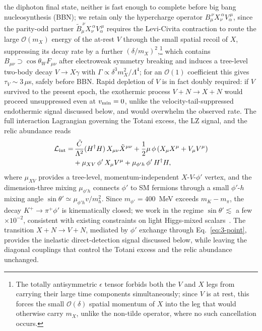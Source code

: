 \documentclass[aps,prl,twocolumn,superscriptaddress,nofootinbib]{revtex4-2}
\begin{document}
the diphoton final state, neither is fast enough to complete before big
bang nucleosynthesis (BBN); we retain only the hypercharge operator
$B_\mu^{\ \nu}X_\nu^{\ \alpha}V_\alpha^{\ \mu}$, since the parity-odd
partner $\tilde B_\mu^{\ \nu}X_\nu^{\ \alpha}V_\alpha^{\ \mu}$ requires
the Levi-Civita contraction to route the large $\mathcal{O}(m_X)$
energy of the at-rest $V$ through the small spatial recoil of $X$,
suppressing its decay rate by a further $(\delta/m_X)^2$,\footnote{The
totally antisymmetric $\epsilon$ tensor forbids both the $V$ and $X$
legs from carrying their large time components simultaneously; since
$V$ is at rest, this forces the small $\mathcal{O}(\delta)$ spatial
momentum of $X$ into the leg that would otherwise carry $m_X$, unlike
the non-tilde operator, where no such cancellation occurs.} which
contains $B_{\mu\nu}\supset\cos\theta_W F_{\mu\nu}$ after electroweak
symmetry breaking and induces a tree-level two-body decay $V\to X\gamma$
with $\Gamma\propto\delta^3m_X^2/\Lambda^4$; for an $\mathcal{O}(1)$
coefficient this gives $\tau_V\sim3\,\mu$s, safely before BBN. Rapid
depletion of $V$ is in fact doubly required: if $V$ survived to the
present epoch, the exothermic process $V+N\to X+N$ would proceed
unsuppressed even at $v_{\rm min}=0$, unlike the
velocity-tail-suppressed endothermic signal discussed below, and would
overwhelm the observed rate. The
full interaction Lagrangian governing the Totani excess, the LZ
signal, and the relic abundance reads
\begin{align}
\mathcal{L}_{\rm int}=&\,\frac{\tilde C}{\Lambda^2}(H^\dagger H)\,
X_{\mu\nu}\tilde X^{\mu\nu}
+\frac12\mu\,\phi\,(X_\mu X^\mu+V_\mu V^\mu)\notag\\
&+\mu_{XV}\,\phi'\,X_\mu V^\mu+\mu_{\phi'h}\,\phi'\,H^\dagger H,
\label{eq:3-point}
\end{align}
where $\mu_{XV}$ provides a tree-level, momentum-independent
$X$-$V$-$\phi'$ vertex, and the dimension-three mixing $\mu_{\phi'h}$
connects $\phi'$ to SM fermions through a small $\phi'$-$h$ mixing
angle $\sin\theta'\simeq\mu_{\phi'h}v/m_h^2$. Since $m_{\phi'}=400$~MeV
exceeds $m_K-m_\pi$, the decay $K^+\to\pi^+\phi'$ is kinematically
closed; we work in the regime $\sin\theta'\lesssim$ a few$\times10^{-2}$,
consistent with existing constraints on light Higgs-mixed
scalars~\cite{HiggsMixingConstraints}. The transition $X+N\to V+N$,
mediated by $\phi'$ exchange through Eq.~\eqref{eq:3-point}, provides
the inelastic direct-detection signal discussed below, while leaving
the diagonal couplings that control the Totani excess and the relic
abundance unchanged.
\end{document}
